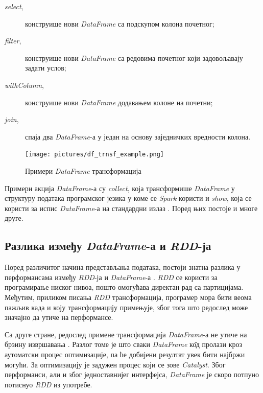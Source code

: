 \documentclass[12pt,oneside]{memoir}
\begin{document}
\begin{description} 
	\item[\textit{select},] конструише нови \textit{DataFrame} са подскупом колона почетног;
	\item[\textit{filter},] конструише нови \textit{DataFrame} са редовима почетног који задовољавају задати услов;
	\item[\textit{withColumn},] конструише нови \textit{DataFrame} додавањем колоне на почетни;
		\item[\textit{join},] спаја два \textit{DataFrame}-а у један на основу заједничких вредности колона.
\end{description}

\begin{figure}[!ht]
  \centering
  \texttt{[image: pictures/df\_trnsf\_example.png]}
  \caption{Примери \textit{DataFrame} трансформација}
  \label{fig:sprk_df_trnsf_example}
\end{figure}

Примери акција \textit{DataFrame}-а су \textit{collect}, која трансформише \textit{DataFrame} у структуру података програмског језика у коме се \textit{Spark} користи и \textit{show}, која се користи за испис \textit{DataFrame}-а на стандардни излаз \cite{spark_guide}. Поред њих постоје и многе друге.

\subsection{Разлика између \textit{DataFrame}-а и \textit{RDD}-ја}
\label{subsec:spark_df_vs_rdd}

Поред различитог начина представљања података, постоји знатна разлика у перформансама између \textit{RDD}-ја и \textit{DataFrame}-а \cite{spark_guide}. \textit{RDD} се користи за програмирање ниског нивоа, пошто омогућава директан рад са партицијама. Међутим, приликом писања \textit{RDD} трансформација, програмер мора бити веома пажљив када и коју трансформацију примењује, због тога што редослед може значајно да утиче на перформансе.

Са друге стране, редослед примене трансформација \textit{DataFrame}-а не утиче на брзину извршавања \cite{spark_guide}. Разлог томе је што сваки \textit{DataFrame} к\^{о}д пролази кроз аутоматски процес оптимизације, па ће добијени резултат увек бити најбржи могући. За оптимизацију је задужен процес који се зове \textit{Catalyst}. Због перформанси, али и због једноставнијег интерфејса, \textit{DataFrame} је скоро потпуно потиснуо \textit{RDD} из употребе.
\end{document}
